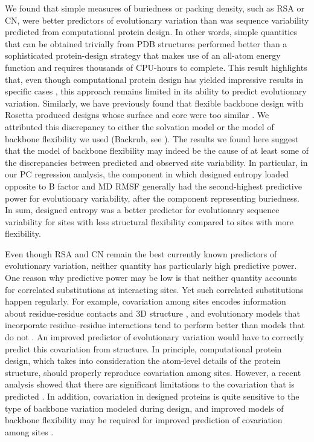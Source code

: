 \documentclass[smallextended]{svjour3}
\begin{document}
We found that simple measures of buriedness or packing density, such as RSA or CN, were better predictors of evolutionary variation than was sequence variability predicted from computational protein design. In other words, simple quantities that can be obtained trivially from PDB structures performed better than a sophisticated protein-design strategy that makes use of an all-atom energy function and requires thousands of CPU-hours to complete. This result highlights that, even though computational protein design has yielded impressive results in specific cases \citep{Kuhlman2003,Rothlisberger2008,Fleishman2011}, this approach remains limited in its ability to predict evolutionary variation. Similarly, we have previously found that flexible backbone design with Rosetta produced designs whose surface and core were too similar \citep{Jacksonetal2013}. We attributed this discrepancy to either the solvation model or the model of backbone flexibility we used (Backrub, see \citealt{Smith2008}). The results we found here suggest that the model of backbone flexibility may indeed be the cause of at least some of the discrepancies between predicted and observed site variability. In particular, in our PC regression analysis, the component in which designed entropy loaded opposite to B factor and MD RMSF generally had the second-highest predictive power for evolutionary variability, after the component representing {\color{red}buriedness.} In sum, designed entropy was a better predictor for evolutionary sequence variability for sites with less structural flexibility compared to sites with more flexibility.

Even though RSA and CN remain the best currently known predictors of evolutionary variation, neither quantity has particularly high predictive power. One reason why predictive power may be low is that neither quantity accounts for correlated substitutions at interacting sites.  Yet such correlated substitutions happen regularly. For example, covariation among sites encodes information about residue-residue contacts and 3D structure \citep{Halabietal2009,BurgervanNimwegen2010,Marksetal2011,Jonesetal2014}, and evolutionary models that incorporate residue--residue interactions tend to perform better than models that do not \citep{Rodrigueetal2005,BordnerMittelmann2014}. An improved predictor of evolutionary variation would have to correctly predict this covariation from structure. In principle, computational protein design, which takes into consideration the atom-level details of the protein structure, should properly reproduce covariation among sites. However, a recent analysis showed that there are significant limitations to the covariation that is predicted \citep{OllikainenKortemme2013}. In addition, covariation in designed proteins is quite sensitive to the type of backbone variation modeled during design, and improved models of backbone flexibility may be required for improved prediction of covariation among sites \citep{OllikainenKortemme2013}.
\end{document}
